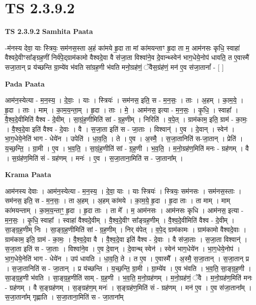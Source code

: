 \documentclass[17pt]{extarticle}
\begin{document}
\section{ TS 2.3.9.2 }

\textbf{TS 2.3.9.2 } \newline
\textbf{Samhita Paata} \newline

-म॑नस्य देवा॒ याः स्त्रियः॒ सम॑नस॒स्ता अ॒हं का॑मये हृ॒दा ता मां का॑मयन्ताꣳ हृ॒दा ता म॒ आम॑नसः कृधि॒ स्वाहा॑ वैश्वदे॒वीꣳसा᳚ङ्ग्रह॒णीं निर्व॑पे॒द्ग्राम॑कामो वैश्वदे॒वा वै स॑जा॒ता विश्वा॑ने॒व दे॒वान्थ्स्वेन॑ भाग॒धेये॒नोप॑ धावति॒ त ए॒वास्मै॑ सजा॒तान् प्र य॑च्छन्ति ग्रा॒म्ये॑व भ॑वति सांग्रह॒णी भ॑वति मनो॒ग्रह॑णं॒ ॅवैस॒ग्रंह॑णं॒ मन॑ ए॒व स॑जा॒तानां᳚ - [  ] \newline

\textbf{Pada Paata} \newline

आम॑न॒स्येत्या - म॒न॒स्य॒ । दे॒वाः॒ । याः । स्त्रियः॑ । सम॑नस॒ इति॒ स - म॒न॒सः॒ । ताः । अ॒हम् । का॒म॒ये॒ । हृ॒दा । ताः । माम् । का॒म॒य॒न्ता॒म् । हृ॒दा । ताः । मे॒ । आम॑नस॒ इत्या - म॒न॒सः॒ । कृ॒धि॒ । स्वाहा᳚ । वै॒श्व॒दे॒वीमिति॑ वैश्व - दे॒वीम् । सा॒ग्रं॒ह॒णीमिति॑ सां - ग्र॒ह॒णीम् । निरिति॑ । व॒पे॒त् । ग्राम॑काम॒ इति॒ ग्राम॑ - का॒मः॒ । वै॒श्व॒दे॒वा इति॑ वैश्व - दे॒वाः । वै । स॒जा॒ता इति॑ स - जा॒ताः । विश्वान्॑ । ए॒व । दे॒वान् । स्वेन॑ । भा॒ग॒धेये॒नेति॑ भाग - धेये॑न । उपेति॑ । धा॒व॒ति॒ । ते । ए॒व । अ॒स्मै॒ । स॒जा॒तानिति॑ स-जा॒तान् । प्रेति॑ । य॒च्छ॒न्ति॒ । ग्रा॒मी ।  ए॒व । भ॒व॒ति॒ । सा॒ग्रं॒ह॒णीति॑ सां - ग्र॒ह॒णी । भ॒व॒ति॒ । म॒नो॒ग्रह॑ण॒मिति॑ मनः - ग्रह॑णम् । वै । स॒ग्रंह॑ण॒मिति॑ सं - ग्रह॑णम् । मनः॑ ।  ए॒व । स॒जा॒ताना॒मिति॑ स - जा॒ताना᳚म् ।  \newline


\textbf{Krama Paata} \newline

आम॑नस्य देवाः । आम॑न॒स्येत्या - म॒न॒स्य॒ । दे॒वा॒ याः । याः स्त्रियः॑ । स्त्रियः॒ सम॑नसः । सम॑नस॒स्ताः । सम॑नस॒ इति॒ स - म॒न॒सः॒ । ता अ॒हम् । अ॒हम् का॑मये । का॒म॒ये॒ हृ॒दा । हृ॒दा ताः । ता माम् । माम् का॑मयन्ताम् । का॒म॒य॒न्ताꣳ॒॒ हृ॒दा । हृ॒दा ताः । ता मे᳚ । म॒ आम॑नसः । आम॑नसः कृधि । आम॑नस॒ इत्या - म॒न॒सः॒ । कृ॒धि॒ स्वाहा᳚ । स्वाहा॑ वैश्वदे॒वीम् । वै॒श्व॒दे॒वीꣳ सा᳚ङ्ग्रह॒णीम् । वै॒श्व॒दे॒वीमिति॑ वैश्व - दे॒वीम् । सा॒ङ्ग्र॒ह॒णीम् निः । सा॒ङ्ग्र॒ह॒णीमिति॑ सां - ग्र॒ह॒णीम् । निर् व॑पेत् । व॒पे॒द् ग्राम॑कामः । ग्राम॑कामो वैश्वदे॒वाः । ग्राम॑काम॒ इति॒ ग्राम॑ - का॒मः॒ । वै॒श्व॒दे॒वा वै । वै॒श्व॒दे॒वा इति॑ वैश्व - दे॒वाः । वै स॑जा॒ताः । स॒जा॒ता विश्वान्॑ । स॒जा॒ता इति॑ स - जा॒ताः । विश्वा॑ने॒व । ए॒व दे॒वान् । दे॒वान्थ् स्वेन॑ । स्वेन॑ भाग॒धेये॑न । भा॒ग॒धेये॒नोप॑ । भा॒ग॒धेये॒नेति॑ भाग - धेये॑न । उप॑ धावति । धा॒व॒ति॒ ते । त ए॒व । ए॒वास्मै᳚ । अ॒स्मै॒ स॒जा॒तान् । स॒जा॒तान् प्र । स॒जा॒तानिति॑ स - जा॒तान् । प्र य॑च्छन्ति । य॒च्छ॒न्ति॒ ग्रा॒मी । ग्रा॒म्ये॑व । ए॒व भ॑वति । भ॒व॒ति॒ सा॒ङ्ग्र॒ह॒णी । सा॒ङ्ग्र॒ह॒णी भ॑वति । सा॒ङ्ग्र॒ह॒णीति॑ साम् - ग्र॒ह॒णी । भ॒व॒ति॒ म॒नो॒ग्रह॑णम् । म॒नो॒ग्रह॑णं॒ ॅवै । म॒नो॒ग्रह॑ण॒मिति॑ मनः - ग्रह॑णम् । वै स॒ङ्ग्रह॑णम् । स॒ङ्ग्रह॑ण॒म् मनः॑ । स॒ङ्ग्रह॑ण॒मिति॑ सं - ग्रह॑णम् । मन॑ ए॒व । ए॒व स॑जा॒ताना᳚म् । स॒जा॒ताना᳚म् गृह्णाति । स॒जा॒ताना॒मिति॑ स - जा॒ताना᳚म् \newline
\end{document}
